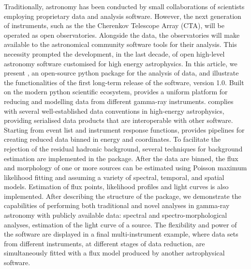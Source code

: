 \documentclass[traditabstract, longauth]{aa}
\begin{document}

\abstract
	{
		Traditionally, \gammaray astronomy has been conducted
		by small collaborations of scientists employing proprietary data and analysis software.
		However, the next generation of \gammaray instruments,
		such as the the Cherenkov Telescope Array (CTA), will be operated as open observatories.
		Alongside the data, the observatories will make available to the astronomical community
		software tools for their analysis. This necessity prompted the development, in the last decade,
		of open high-level astronomy software customised for high energy astrophysics.
	}
	{
		In this article, we present \gammapy, an open-source python package for the analysis of \gammaray data,
		and illustrate the functionalities of the first long-term release of the software, version 1.0.
		Built on the modern python scientific ecosystem, \gammapy provides a uniform platform for reducing and
		modelling data from different gamma-ray instruments. \gammapy complies with several well-established
		data conventions in high-energy astrophysics, providing serialised data products that are interoperable
		with other software.
	}
	{
		Starting from event list and instrument response functions,
		\gammapy provides pipelines for creating reduced data binned in energy and coordinates.
		To facilitate the rejection of the residual hadronic background, several techniques for background estimation
		are implemented in the package.
		After the data are binned, the flux and morphology of one or more \gammaray sources can be estimated
		using Poisson maximum likelihood fitting
		and assuming a variety of spectral, temporal, and spatial models.
		Estimation of flux points, likelihood profiles and light curves is also implemented.
	}
	{
		After describing the structure of the package, we demonstrate the capabilities of \gammapy
		performing both traditional and novel analyses in gamma-ray astronomy with publicly available data:
		spectral and spectro-morphological analyses, estimation of the light curve of a source.
		The flexibility and power of the software are displayed in a final multi-instrument example,
		where data sets from different instruments, at different stages of data reduction,
		are simultaneously fitted with a flux model produced by another astrophysical software.
	}{}


\end{document}

